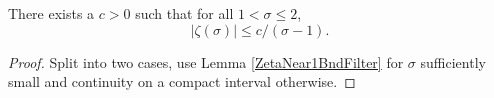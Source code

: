 \begin{lemma}
\label{ZetaNear1BndExact}
\leanok
There exists a $c>0$ such that for all $1 < \sigma ≤ 2$,
  $$
  |\zeta(\sigma)| ≤ c/(\sigma-1).
  $$
\end{lemma}
\begin{proof}
\leanok
Split into two cases, use Lemma \ref{ZetaNear1BndFilter} for $\sigma$ sufficiently small
  and continuity on a compact interval otherwise.
\end{proof}
